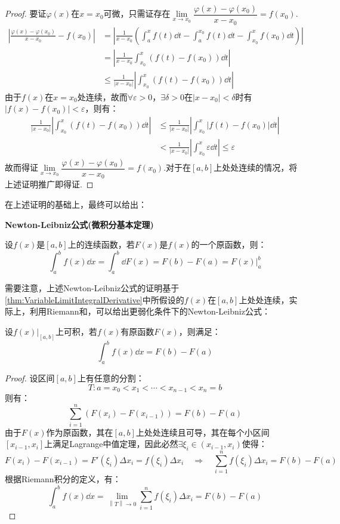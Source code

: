 \begin{proof}
    要证$\varphi(x)$在$x=x_0$可微，只需证存在$\lim\limits_{x \to x_0}\dfrac{\varphi(x)-\varphi(x_0)}{x-x_0} = f(x_0)$.
    \begin{align*}
        \left|\frac{\varphi(x) - \varphi(x_0)}{x-x_0} - f(x_0)\right| &= \left|\frac{1}{x-x_0}\left(\int_{a}^{x}f(t)\dd{t} - \int_{a}^{x_0}f(t)\dd{t} - \int_{x_0}^{x}f(x_0)\dd{t}\right)\right|\\
        &= \left|\frac{1}{x-x_0}\int_{x_0}^{x}(f(t)-f(x_0))\dd{t}\right|\\
        &\leqslant \frac{1}{|x-x_0|}\left|\int_{x_0}^{x}(f(t)-f(x_0))\dd{t}\right|
    \end{align*}
    由于$f(x)$在$x=x_0$处连续，故而$\forall \varepsilon > 0$，$\exists \delta > 0$在$|x-x_0|<\delta$时有$|f(x)-f(x_0)|<\varepsilon$，则有：
    \begin{align*}
        \frac{1}{|x-x_0|}\left|\int_{x_0}^{x}(f(t)-f(x_0))\dd{t}\right| &\leqslant \frac{1}{|x-x_0|}\left|\int_{x_0}^{x}|f(t)-f(x_0)|\dd{t}\right|\\
        &< \frac{1}{|x-x_0|}\left|\int_{x_0}^{x}\varepsilon\dd{t}\right| \leqslant \varepsilon
    \end{align*}
    故而得证$\lim\limits_{x \to x_0}\dfrac{\varphi(x)-\varphi(x_0)}{x-x_0} = f(x_0)$.对于在$[a,b]$上处处连续的情况，将上述证明推广即得证.
\end{proof}

在上述证明的基础上，最终可以给出：

\begin{theorem}
    \textbf{Newton-Leibniz公式(微积分基本定理)}
    \label{thm:NewtonLeibnizTheorem}

    设$f(x)$是$[a,b]$上的连续函数，若$F(x)$是$f(x)$的一个原函数，则：
    \[\int_{a}^{b} f(x)\dd{x} = \int_{a}^{b}\dd{F(x)} = F(b) - F(a) = F(x)\Big|_{a}^{b}\]
\end{theorem}

需要注意，上述Newton-Leibniz公式的证明基于\cref{thm:VariableLimitIntegralDerivative}中所假设的$f(x)$在$[a,b]$上处处连续，实际上，利用Riemann和，可以给出更弱化条件下的Newton-Leibniz公式：

\begin{theorem}
    设$\left.f(x)\right|_{[a,b]}$上可积，若$f(x)$有原函数$F(x)$，则满足：
    \[\int_{a}^{b}f(x)\dd{x} = F(b) - F(a)\]
\end{theorem}

\begin{proof}
    设区间$[a,b]$上有任意的分割：
    \[T:a=x_0<x_1<\cdots<x_{n-1}<x_n=b\]
    则有：
    \[\sum_{i=1}^{n}(F(x_i) - F(x_{i-1})) = F(b) - F(a)\]
    由于$F(x)$作为原函数，其在$[a,b]$上处处连续且可导，其在每个小区间$[x_{i-1},x_i]$上满足Lagrange中值定理，因此必然$\exists \xi_i \in (x_{i-1},x_i)$使得：
    \[F(x_i) - F(x_{i-1}) = F'(\xi_i)\Delta x_i = f(\xi_i)\Delta x_i \quad\Rightarrow\quad \sum_{i=1}^{n}f(\xi_i)\Delta x_i = F(b)-F(a)\]
    根据Riemann积分的定义，有：
    \[\int_{a}^{b}f(x)\dd{x} = \lim_{\left\|T\right\| \to 0}\sum_{i=1}^{n}f(\xi_i)\Delta x_i = F(b)-F(a)\]
\end{proof}

